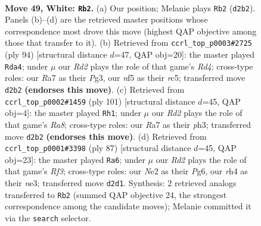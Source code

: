 \documentclass[11pt]{article}
\begin{document}
\clearpage

\begin{figure}[p]\centering
\begin{subfigure}{0.46\textwidth}\centering
\resizebox{\linewidth}{!}{%
\newchessgame
\chessboard[
  setfen={6r1/R7/3pk1p1/5n1p/7r/1p6/3RN1P1/5K2 w - - 4 49},
  showmover=false,
  pgfstyle=straightmove, color=movearrow, markmove={d2-b2}
]}
\caption{}
\end{subfigure}\hfill
\begin{subfigure}{0.46\textwidth}\centering
\resizebox{\linewidth}{!}{%
\newchessgame
\chessboard[
  setfen={8/p4pk1/8/p1r3np/3R2p1/6P1/7P/R5K1 w - - 4 48},
  showmover=false,
  pgfstyle=straightmove, color=movearrow, markmove={d4-a4}
]}
\caption{}
\end{subfigure}
\\[4pt]
\begin{subfigure}{0.46\textwidth}\centering
\resizebox{\linewidth}{!}{%
\newchessgame
\chessboard[
  setfen={8/8/8/4n1pp/4k3/PR5P/1PN2K2/r7 b - - 27 51},
  showmover=false,
  pgfstyle=straightmove, color=movearrow, markmove={a1-h1}
]}
\caption{}
\end{subfigure}\hfill
\begin{subfigure}{0.46\textwidth}\centering
\resizebox{\linewidth}{!}{%
\newchessgame
\chessboard[
  setfen={2r3k1/7p/5rp1/3P4/8/4N1PP/1R3P2/6K1 b - - 3 44},
  showmover=false,
  pgfstyle=straightmove, color=movearrow, markmove={f6-a6}
]}
\caption{}
\end{subfigure}
\caption{\textbf{Move 49, White: \texttt{Rb2}.} (a) Our position; Melanie plays \texttt{Rb2} (\texttt{d2b2}). Panels (b)--(d) are the retrieved master positions whose correspondence most drove this move (highest QAP objective among those that transfer to it). (b) Retrieved from \texttt{ccrl\_top\_p0003\#2725} (ply 94) [structural distance $d$=47, QAP obj=20]: the master played \texttt{Rda4}; under $\mu$ our \emph{Rd2} plays the role of that game's \emph{Rd4}; cross-type roles: our \emph{R}a7 as their \emph{P}g3, our \emph{n}f5 as their \emph{r}c5; transferred move \texttt{d2b2} \textbf{(endorses this move)}. (c) Retrieved from \texttt{ccrl\_top\_p0002\#1459} (ply 101) [structural distance $d$=45, QAP obj=4]: the master played \texttt{Rh1}; under $\mu$ our \emph{Rd2} plays the role of that game's \emph{Ra8}; cross-type roles: our \emph{R}a7 as their \emph{p}h3; transferred move \texttt{d2b2} \textbf{(endorses this move)}. (d) Retrieved from \texttt{ccrl\_top\_p0001\#3398} (ply 87) [structural distance $d$=45, QAP obj=23]: the master played \texttt{Ra6}; under $\mu$ our \emph{Rd2} plays the role of that game's \emph{Rf3}; cross-type roles: our \emph{N}e2 as their \emph{P}g6, our \emph{r}h4 as their \emph{n}e3; transferred move \texttt{d2d1}. Synthesis: 2 retrieved analogs transferred to \texttt{Rb2} (summed QAP objective 24, the strongest correspondence among the candidate moves); Melanie committed it via the \texttt{search} selector.}
\label{fig:thought-m96}
\end{figure}
\end{document}
